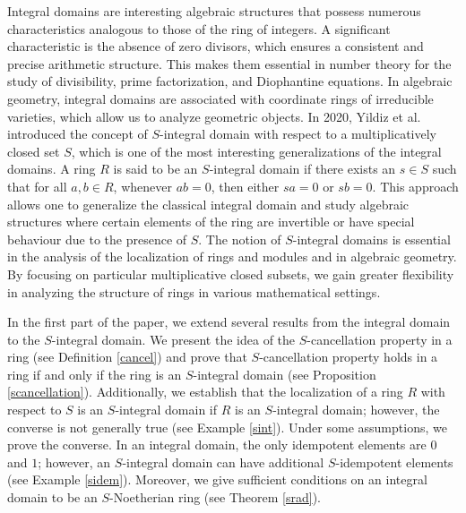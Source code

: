\documentclass[11pt]{article}
\begin{document}
	
	Integral domains are interesting algebraic structures that possess numerous characteristics analogous to those of the ring of integers. A significant characteristic is the absence of zero divisors, which ensures a consistent and precise arithmetic structure. This makes them essential in number theory for the study of divisibility, prime factorization, and Diophantine equations. In algebraic geometry, integral domains are associated with coordinate rings of irreducible varieties, which allow us to analyze geometric objects. In 2020, Yildiz et al. \cite{ed20} introduced the concept of $S$-integral domain with respect to a multiplicatively closed set $S$, which is one of the most interesting generalizations of the integral domains. A ring $R$ is said to be an $S$-integral domain if there exists an $s \in S$ such that for all $a, b \in R$, whenever $ab = 0$, then either $sa = 0$ or $sb = 0$. This approach allows one to generalize the classical integral domain and study algebraic structures where certain elements of the ring are invertible or have special behaviour due to the presence of $S$. The notion of $S$-integral domains is essential in the analysis of the localization of rings and modules and in algebraic geometry.
	By focusing on particular multiplicative closed subsets, we gain greater flexibility in analyzing the structure of rings in various mathematical settings.
	
	
	In the first part of the paper, we extend several results from the integral domain to the $S$-integral domain. We present the idea of the $S$-cancellation property in a ring (see Definition \ref{cancel}) and prove that $S$-cancellation property holds in a ring if and only if the ring is an $S$-integral domain (see Proposition \ref{scancellation}). Additionally, we establish that the localization of a ring $R$ with respect to $S$ is an $S$-integral domain if $R$ is an $S$-integral domain; however, the converse is not generally true (see Example \ref{sint}). Under some assumptions, we prove the converse. In an integral domain, the only idempotent elements are $0$ and $1$; however, an $S$-integral domain can have additional $S$-idempotent elements (see Example \ref{sidem}). Moreover, we give sufficient conditions on an integral domain to be an $S$-Noetherian ring (see Theorem \ref{srad}). 
	
\end{document}

